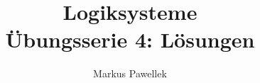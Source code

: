 

\title{Logiksysteme \\ Übungsserie 4: Lösungen}
\author{Markus Pawellek}
\newcommand{\email}{markuspawellek@gmail.com}

\usepackage{multicol}
\usepackage{sty/uniinput}

\newcommand{\separate}{\quad}

\usepackage{turnstile}

\newcommand{\fregeProof}{\sststile{\m{Fre}}{}{}}
\newcommand{\fregeI}{\m{F1}}
\newcommand{\fregeII}{\m{F2}}
\newcommand{\fregeIII}{\m{F3}}
\newcommand{\modusPonens}{\m{MP}}

\newcommand{\fulfills}{\sdtstile{}{}{}}
\newcommand{\infers}{\ddtstile{}{}{}}



	\articletitle

